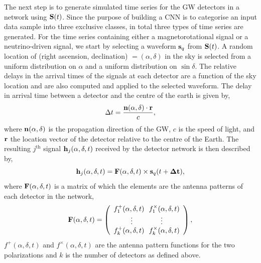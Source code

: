 \documentclass[aps,twocolumn,showpacs,groupedaddress, nofootinbib]{revtex4}  %
\begin{document}
%
%
The next step is to generate simulated time series for the \ac{GW} detectors in
a network using $\bold{S}(t)$.
Since the purpose of building a \ac{CNN} is to categorise an input data sample
into three exclusive classes, in total three types of time series are
generated.  For the time series containing either a magnetorotational signal or
a neutrino-driven signal, we start by selecting a waveform $\bold{s}_q$ from
$\bold{S}(t)$. A random location of (right ascension, declination) $=(\alpha,
\delta)$ in the sky is selected from a uniform distribution on $\alpha$ and a
uniform distribution on $\sin\delta$. 
%
%
The relative delays in the arrival times of the signals at each
detector are a function of the sky location and are also computed and applied
to the selected waveform. The delay in arrival time between a detector and the
centre of the earth is given by,
%
\begin{equation}\label{eq:tdetector}
\Delta t = \frac{\bold{n}(\alpha,\delta) \cdot \bold{r}}{c},
\end{equation}
%
where $\bold{n}(\alpha,\delta)$ is the propagation direction of the \ac{GW},
$c$ is the speed of light, and $\bold{r}$ the location vector of the detector
relative to the centre of the Earth. The resulting $j^{\text{th}}$ signal $\bold{h}_j(\alpha,
\delta, t)$ received by the detector network is then described by,
%
\begin{equation}\label{eq:ht2}
 \bold{h}_j(\alpha, \delta, t) = \bold{F}(\alpha, \delta, t) \times
\bold{s}_q(t+\bold{\Delta t}),
\end{equation}
%
where $\bold{F}(\alpha, \delta, t)$ is a matrix of which the elements are the antenna patterns of each detector in the network,
%
\begin{equation}\label{eq:ap}
\bold{F}(\alpha, \delta, t)= \left(\begin{array}{cc}
f_1^+(\alpha, \delta, t)~~f_1^\times(\alpha, \delta, t) \\
\vdots~~~~~~~~~~~~\vdots \\
f_k^+(\alpha, \delta, t)~~f_k^\times(\alpha, \delta, t) \\
\end{array}\right),
\end{equation}
%
$f^+(\alpha, \delta, t)$ and $f^{\times}(\alpha, \delta, t)$
are the antenna pattern functions for the two polarizations and $k$ is the
number of detectors as defined above. 
%
\end{document}
